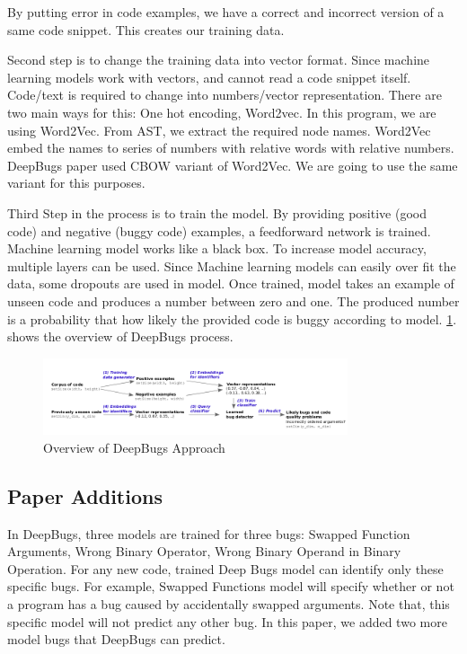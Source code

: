 \documentclass[sigconf]{acmart}
\begin{document}
    By putting error in code examples, we have a correct and incorrect version of a same code snippet. This creates our training data. 
    
    Second step is to change the training data into vector format. Since machine learning models work with vectors, and cannot read a code snippet itself. Code/text is required to change into numbers/vector representation. There are two main ways for this: One hot encoding, Word2vec. In this program, we are using Word2Vec. From AST, we extract the required node names. Word2Vec embed the names to series of numbers with relative words with relative numbers. DeepBugs paper used CBOW variant of Word2Vec. We are going to use the same variant for this purposes. 
    
    Third Step in the process is to train the model. By providing positive (good code) and negative (buggy code) examples, a feedforward network is trained. Machine learning model works like a black box. To increase model accuracy, multiple layers can be used. Since Machine learning models can easily over fit the data, some dropouts are used in model. Once trained, model takes an example of unseen code and produces a number between zero and one. The produced number is a probability that how likely the provided code is buggy according to model. \ref{overview}. shows the overview of DeepBugs process.
    
 
 \begin{figure}[h!]
 \centering
  \includegraphics[width=0.8\textwidth]{DeepBugs_Overview of Approach.png}
  \caption{\small Overview of DeepBugs Approach}
  \label{overview}%
\end{figure}
 
 
\subsection{Paper Additions} 
In DeepBugs, three models are trained for three bugs: Swapped Function Arguments, Wrong Binary Operator, Wrong Binary Operand in Binary Operation. For any new code, trained Deep Bugs model can identify only these specific bugs. For example, Swapped Functions model will specify whether or not a program has a bug caused by accidentally swapped arguments. Note that, this specific model will not predict any other bug. In this paper, we added two more model bugs that DeepBugs can predict. 
\end{document}

